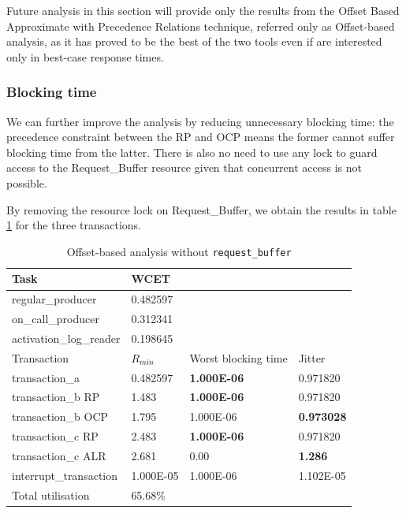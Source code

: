 \documentclass{article}
\begin{document}
Future analysis in this section will provide only the results from the Offset Based Approximate with Precedence Relations technique, referred only as Offset-based analysis, as it has proved to be the best of the two tools even if are interested only in best-case response times.

\subsubsection{Blocking time}

We can further improve the analysis by reducing unnecessary blocking time: the precedence constraint between the RP and OCP means the former cannot suffer blocking time from the latter. There is also no need to use any lock to guard access to the Request\_Buffer resource given that concurrent access is not possible.

By removing the resource lock on Request\_Buffer, we obtain the results in table \ref{tab:off-approx-w-pr-blocking-time} for the three transactions.

\begin{table}[!htbp]
   \centering
   \begin{tabular}{llll}
    \toprule
    Task & WCET \\
    \midrule
    regular\_producer & 0.482597 \\
    on\_call\_producer & 0.312341 \\
    activation\_log\_reader & 0.198645 \\
    \toprule
    \toprule
    Transaction & $R_{min}$ & Worst blocking time & Jitter \\
    \midrule
    transaction\_a & 0.482597 &  \textbf{1.000E-06} & 0.971820 \\
    transaction\_b RP & 1.483 & \textbf{1.000E-06} & 0.971820 \\
    transaction\_b OCP & 1.795 & 1.000E-06 & \textbf{0.973028} \\
    transaction\_c RP & 2.483 & \textbf{1.000E-06} & 0.971820 \\
    transaction\_c ALR & 2.681 & 0.00 & \textbf{1.286} \\
    interrupt\_transaction & 1.000E-05 & 1.000E-06 & 1.102E-05 \\
    \toprule
    \toprule
    Total utilisation & 65.68\% \\
   \end{tabular}
   \caption{Offset-based analysis without \texttt{request\_buffer}}
   \label{tab:off-approx-w-pr-blocking-time}
 \end{table}
\end{document}
